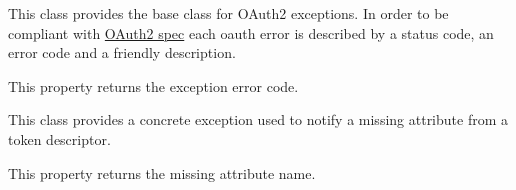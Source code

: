 \documentclass[letterpaper,10pt,english]{sphinxmanual}
\begin{document}
\begin{fulllineitems}
\label{features/oauth2/technical_summary:fantastico.oauth2.exceptions.OAuth2Error}
This class provides the base class for OAuth2 exceptions. In order to be compliant with
\href{http://tools.ietf.org/html/rfc6749}{OAuth2 spec} each oauth error is described by a status code, an error code and a
friendly description.

\begin{fulllineitems}
\label{features/oauth2/technical_summary:fantastico.oauth2.exceptions.OAuth2Error.error_code}
This property returns the exception error code.

\end{fulllineitems}


\end{fulllineitems}


\begin{fulllineitems}
\label{features/oauth2/technical_summary:fantastico.oauth2.exceptions.OAuth2InvalidTokenDescriptorError}
This class provides a concrete exception used to notify a missing attribute from a token descriptor.

\begin{fulllineitems}
\label{features/oauth2/technical_summary:fantastico.oauth2.exceptions.OAuth2InvalidTokenDescriptorError.attr_name}
This property returns the missing attribute name.

\end{fulllineitems}


\end{fulllineitems}

\end{document}
